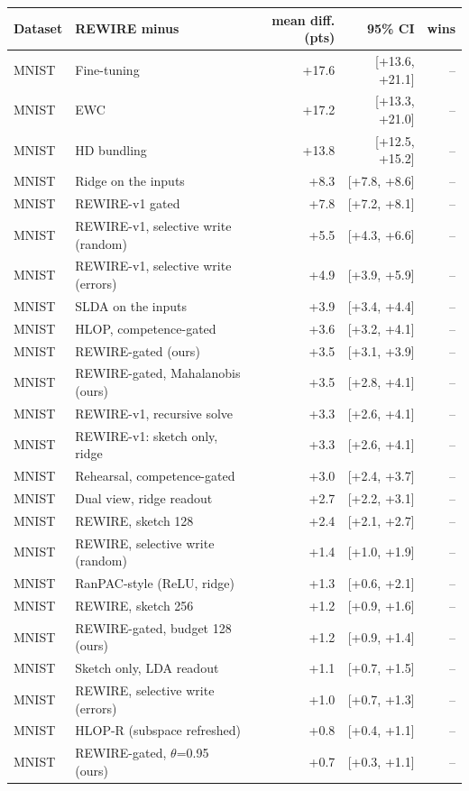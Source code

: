 \begin{tabular}{llrrr}
\toprule
Dataset & REWIRE minus & mean diff. (pts) & 95\% CI & wins \\
\midrule
MNIST & Fine-tuning & +17.6 & [+13.6, +21.1] & -- \\
MNIST & EWC & +17.2 & [+13.3, +21.0] & -- \\
MNIST & HD bundling & +13.8 & [+12.5, +15.2] & -- \\
MNIST & Ridge on the inputs & +8.3 & [+7.8, +8.6] & -- \\
MNIST & REWIRE-v1 gated & +7.8 & [+7.2, +8.1] & -- \\
MNIST & REWIRE-v1, selective write (random) & +5.5 & [+4.3, +6.6] & -- \\
MNIST & REWIRE-v1, selective write (errors) & +4.9 & [+3.9, +5.9] & -- \\
MNIST & SLDA on the inputs & +3.9 & [+3.4, +4.4] & -- \\
MNIST & HLOP, competence-gated & +3.6 & [+3.2, +4.1] & -- \\
MNIST & REWIRE-gated (ours) & +3.5 & [+3.1, +3.9] & -- \\
MNIST & REWIRE-gated, Mahalanobis (ours) & +3.5 & [+2.8, +4.1] & -- \\
MNIST & REWIRE-v1, recursive solve & +3.3 & [+2.6, +4.1] & -- \\
MNIST & REWIRE-v1: sketch only, ridge & +3.3 & [+2.6, +4.1] & -- \\
MNIST & Rehearsal, competence-gated & +3.0 & [+2.4, +3.7] & -- \\
MNIST & Dual view, ridge readout & +2.7 & [+2.2, +3.1] & -- \\
MNIST & REWIRE, sketch 128 & +2.4 & [+2.1, +2.7] & -- \\
MNIST & REWIRE, selective write (random) & +1.4 & [+1.0, +1.9] & -- \\
MNIST & RanPAC-style (ReLU, ridge) & +1.3 & [+0.6, +2.1] & -- \\
MNIST & REWIRE, sketch 256 & +1.2 & [+0.9, +1.6] & -- \\
MNIST & REWIRE-gated, budget 128 (ours) & +1.2 & [+0.9, +1.4] & -- \\
MNIST & Sketch only, LDA readout & +1.1 & [+0.7, +1.5] & -- \\
MNIST & REWIRE, selective write (errors) & +1.0 & [+0.7, +1.3] & -- \\
MNIST & HLOP-R (subspace refreshed) & +0.8 & [+0.4, +1.1] & -- \\
MNIST & REWIRE-gated, $\theta$=0.95 (ours) & +0.7 & [+0.3, +1.1] & -- \\

\end{tabular}
